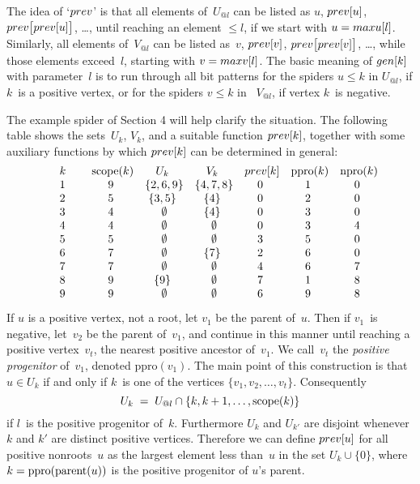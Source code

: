 The idea of `$\\{prev}$' is that all elements of~$U_{@l}$ can
be listed as $u$, $\\{prev}[u]$, $\\{prev}\bigl[\\{prev}[u]\bigr]$, \dots,
until reaching an element $\leq l$, if we start with 
$u=\\{maxu}[l]$.  Similarly, all elements of~$V_{@l}$
can be listed as~$v$, $\\{prev}[v]$, $\\{prev}\bigl[\\{prev}[v]\bigr]$, \dots,
while those elements exceed~$l$, starting with 
$v=\\{maxv}[l]$.  The basic meaning of $\\{gen}[k]$ with
parameter~$l$ is to run through all bit patterns for the
spiders $u\le k$ in $U_{@l}$, if $k$~is a positive vertex, or for the
spiders $v\le k$ in~ $V_{@l}$, if vertex $k$~is negative.

The example spider of Section 4 will help clarify the
situation.  The following table shows the sets~$U_k$, $V_k$,
and a suitable function $\\{prev}[k]$, together with some
auxiliary functions by which $\\{prev}[k]$ can be determined in
general:
$$\vbox{\halign{\indent#\quad\hfil&\quad\hfil#\hfil&\quad\hfil#\hfil&\quad\hfil#\hfil&\quad\hfil#\hfil&\quad\hfil#\hfil&\quad\hfil#\hfil\cr
$k$&$\scope(k)$&   $U_k$   &   $V_k$
&$\\{prev}[k]$&ppro$(k)$&npro$(k)$\cr
 1 &    9      &$\{2,6,9\}$&$\{4,7,8\}$&     0    &   1
&   0   \cr
 2 &    5      & $\{3,5\}$ &  $\{4\}$  &     0    &   2
&   0   \cr
 3 &    4      &$\emptyset$&  $\{4\}$  &     0    &   3
&   0   \cr
 4 &    4      &$\emptyset$&$\emptyset$&     0    &   3
&   4   \cr
 5 &    5      &$\emptyset$&$\emptyset$&     3    &   5
&   0   \cr
 6 &    7      &$\emptyset$&  $\{7\}$  &     2    &   6
&   0   \cr
 7 &    7      &$\emptyset$&$\emptyset$&     4    &   6
&   7   \cr
 8 &    9      &  $\{9\}$  &$\emptyset$&     7    &   1
&   8   \cr
 9 &    9      &$\emptyset$&$\emptyset$&     6    &   9
&   8   \cr}}$$

If $u$ is a positive vertex, not a root, let $v_1$ be the
parent of~$u$.  Then if $v_1$~is negative, let~$v_2$ be the
parent of~$v_1$, and continue in this manner until reaching
a positive vertex~$v_t$, the nearest positive ancestor
of~$v_1$.  We call~$v_t$ the 
{\it positive progenitor\/} of~$v_1$, denoted ppro$(v_1)$. The
main point of this construction is that $u\in U_k$ if and
only if $k$~is one of the vertices 
$\{v_1,v_2,\ldots,v_t\}$.  Consequently
$$U_k\;=\;U_{@l}\cap\{k,k+1,\ldots,{\rm scope}(k)\}$$
if $l$~is the positive progenitor of~$k$.  Furthermore
$U_k$ and $U_{k'}$ are disjoint whenever $k$ and $k'$ are
distinct positive vertices.  Therefore we can define
$\\{prev}[u]$ for all positive nonroots~$u$ as the largest
element less than~$u$ in the set 
$U_k\cup\{0\}$, where $k={\rm ppro(parent}(u))$
is the positive progenitor of $u$'s parent.

